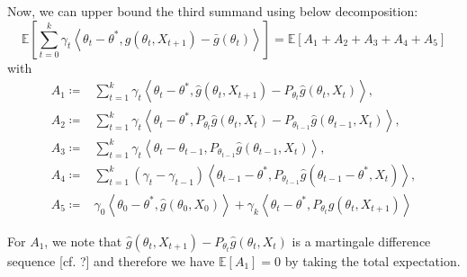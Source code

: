 \documentclass[a4paper]{article}
\begin{document}
Now, we can upper bound the third summand using below decomposition:
\begin{equation}
	\mathbb{E}\left[ \sum_{t = 0}^{k} \gamma_{t}\left\langle \theta_{t} - \theta^{*}, g(\theta_{t}, X_{t + 1}) - \bar{g}(\theta_{t}) \right\rangle \right] = \mathbb{E}\left[ A_{1} + A_{2} + A_{3} + A_{4} + A_{5}\right]
\end{equation}
with
\begin{equation*}
	\begin{split}
		A_{1} \coloneq & \sum_{t = 1}^{k}\gamma_{t}\left\langle \theta_{t} - \theta^{*}, \hat{g}\left(\theta_{t}, X_{t + 1}\right) - P_{\theta_{t}}\hat{g}\left(\theta_{t}, X_{t}\right) \right\rangle,\\
		A_{2} \coloneq & \sum_{t = 1}^{k}\gamma_{t}\left\langle \theta_{t} - \theta^{*}, P_{\theta_{t}}\hat{g}\left(\theta_{t}, X_{t}\right) - P_{\theta_{t - 1}}\hat{g}\left( \theta_{t - 1}, X_{t} \right) \right\rangle,\\
		A_{3} \coloneq & \sum_{t = 1}^{k}\gamma_{t}\left\langle \theta_{t} - \theta_{t - 1}, P_{\theta_{t - 1}}\hat{g}\left( \theta_{t - 1}, X_{t}\right) \right\rangle,\\
		A_{4} \coloneq & \sum_{t = 1}^{k}\left(\gamma_{t} - \gamma_{t - 1}\right)\left\langle \theta_{t - 1} - \theta^{*}, P_{\theta_{t - 1}}\hat{g}\left( \theta_{t - 1} - \theta^{*}, X_{t}\right) \right\rangle,\\
		A_{5} \coloneq & \gamma_{0}\left\langle \theta_{0} - \theta^{*}, \hat{g}\left(\theta_{0}, X_{0}\right) \right\rangle + \gamma_{k}\left\langle \theta_{t} - \theta^{*}, P_{\theta_{t}}\hat{g}\left(\theta_{t}, X_{t + 1}\right)\right\rangle
	\end{split}
\end{equation*}

For $A_{1}$, we note that $\hat{g}\left(\theta_{t}, X_{t + 1}\right) - P_{\theta_{t}}\hat{g}\left(\theta_{t}, X_{t}\right)$ is a martingale difference sequence [cf. ?] and therefore we have $\mathbb{E}[A_{1}] = 0$ by taking the total expectation.
\end{document}

